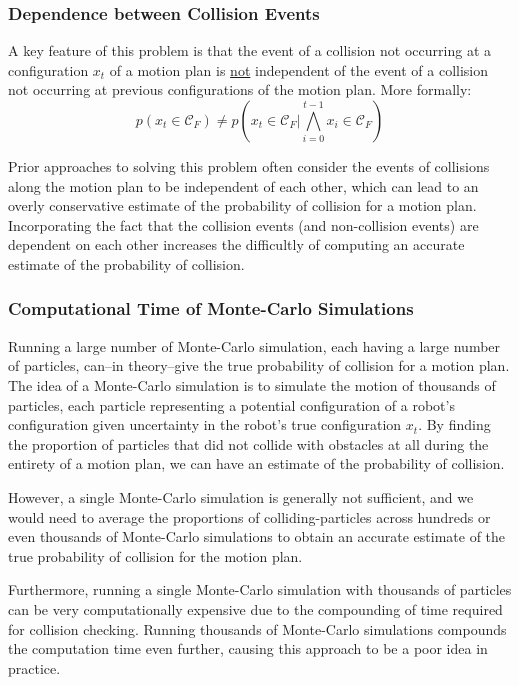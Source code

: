 \documentclass[journal]{IEEEtran}
\begin{document}
\subsubsection{Dependence between Collision Events}
A key feature of this problem is that the event of a collision not occurring at a configuration $x_t$ of a motion plan is \underline{not} independent of the event of a collision not occurring at previous configurations of the motion plan. More formally:
$$p(x_t \in \mathcal{C}_F) \neq p\left(x_t \in \mathcal{C}_F | \bigwedge\limits_{i=0}^{t-1} x_i \in \mathcal{C}_F \right)$$

Prior approaches to solving this problem {\color{red}{cite here}} often consider the events of collisions along the motion plan to be independent of each other, which can lead to an overly conservative estimate of the probability of collision for a motion plan. Incorporating the fact that the collision events (and non-collision events) are dependent on each other increases the difficultly of computing an accurate estimate of the probability of collision.

\subsubsection{Computational Time of Monte-Carlo Simulations}

Running a large number of Monte-Carlo simulation, each having a large number of particles, can--in theory--give the true probability of collision for a motion plan. The idea of a Monte-Carlo simulation is to simulate the motion of thousands of particles, each particle representing a potential configuration of a robot's configuration given uncertainty in the robot's true configuration $x_t$. By finding the proportion of particles that did not collide with obstacles at all during the entirety of a motion plan, we can have an estimate of the probability of collision.

However, a single Monte-Carlo simulation is generally not sufficient, and we would need to average the proportions of colliding-particles across hundreds or even thousands of Monte-Carlo simulations to obtain an accurate estimate of the true probability of collision for the motion plan.

Furthermore, running a single Monte-Carlo simulation with thousands of particles can be very computationally expensive due to the compounding of time required for collision checking. Running thousands of Monte-Carlo simulations compounds the computation time even further, causing this approach to be a poor idea in practice.%
\end{document}
